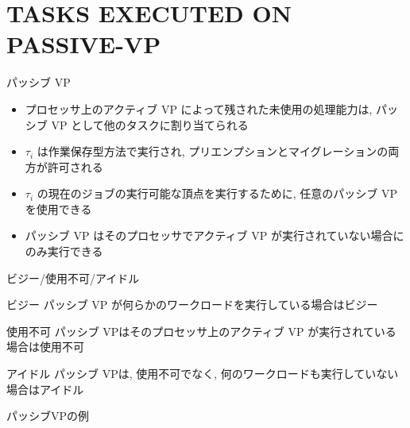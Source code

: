
\section{TASKS EXECUTED ON PASSIVE-VP}
\label{sec: tasks executed on passive-vp}

\begin{frame}{パッシブ VP}
    \begin{itemize}
        \item プロセッサ上のアクティブ VP によって残された未使用の処理能力は, パッシブ VP として他のタスクに割り当てられる
        \item $\tau_{i}$ は作業保存型方法で実行され, プリエンプションとマイグレーションの両方が許可される
        \item $\tau_{i}$ の現在のジョブの実行可能な頂点を実行するために, 任意のパッシブ VP を使用できる
        \item パッシブ VP はそのプロセッサでアクティブ VP が実行されていない場合にのみ実行できる
    \end{itemize}
\end{frame}

\begin{frame}{ビジー/使用不可/アイドル}
    \begin{block}{ビジー}
        パッシブ VP が何らかのワークロードを実行している場合はビジー
    \end{block}
    \begin{block}{使用不可}
        パッシブ VPはそのプロセッサ上のアクティブ VP が実行されている場合は使用不可
    \end{block}
    \begin{block}{アイドル}
        パッシブ VPは, 使用不可でなく, 何のワークロードも実行していない場合はアイドル
    \end{block}
\end{frame}

\begin{frame}{パッシブVPの例}
\end{frame}

